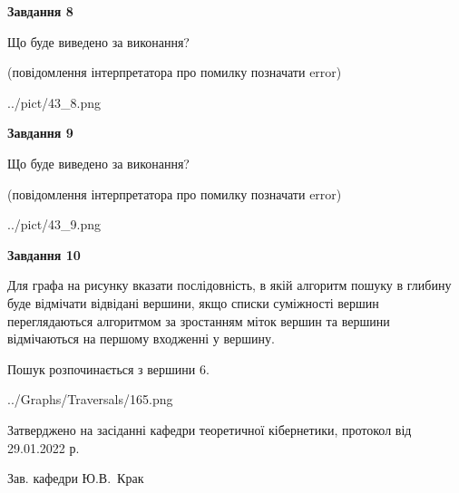 \documentclass[12pt, ukrainian]{article}
\begin{document}
{\begin {large}
{\begin {center}\textbf{Завдання 8}\end {center}}\par
Що буде виведено за виконання?\par
 (повідомлення інтерпретатора про помилку позначати error)
\begin{center}
	{../pict/43_8.png}
\end{center}
\newpage

{\begin {center}\textbf{Завдання 9}\end {center}}\par
Що буде виведено за виконання?\par
 (повідомлення інтерпретатора про помилку позначати error)\par
\begin{center}
	{../pict/43_9.png}
\end{center}
\newpage

{\begin {center}\textbf{Завдання 10}\end {center}}\par
Для графа на рисунку вказати послідовність, в якій алгоритм пошуку в глибину буде відмічати відвідані вершини, якщо списки суміжності вершин переглядаються алгоритмом за зростанням міток вершин та вершини відмічаються на першому вход\-женні у вершину.\par
Пошук розпочинається з вершини 6.\par

\begin{center}
	{../Graphs/Traversals/165.png}
\end{center}\par
\newpage


\end {large}
}
{\smallskip \begin {small} Затверджено на засіданні кафедри теоретичної кібернетики, протокол  від   29.01.2022 р.\par\smallskip\smallskip
{\parbox {6.5 cm}{Зав. кафедри \dotfill Ю.В.~Крак}} \end{small}}
\end{document}
